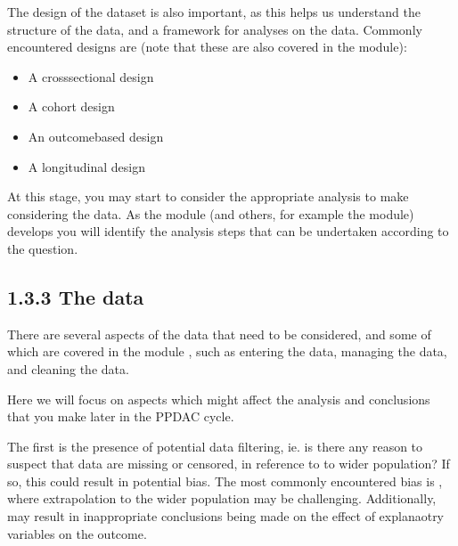 \documentclass[letterpaper,10pt,english]{jupyterBook}
\begin{document}
\sphinxAtStartPar
The design of the dataset is also important, as this helps us understand the structure of the data, and a framework for analyses on the data. Commonly encountered designs are (note that these are also covered in the  module):
\begin{itemize}
\item {} 
\sphinxAtStartPar
A cross\sphinxhyphen{}sectional design

\item {} 
\sphinxAtStartPar
A cohort design

\item {} 
\sphinxAtStartPar
An outcome\sphinxhyphen{}based design

\item {} 
\sphinxAtStartPar
A longitudinal design

\end{itemize}

\sphinxAtStartPar
At this stage, you may start to consider the appropriate analysis to make considering the data. As the module (and others, for example the  module) develops you will identify the analysis steps that can be undertaken according to the question.


\subsection{1.3.3 The data}
\label{\detokenize{01. Introduction:the-data}}
\sphinxAtStartPar
There are several aspects of the data that need to be considered, and some of which are covered in the module , such as entering the data, managing the data, and cleaning the data.

\sphinxAtStartPar
Here we will focus on aspects which might affect the analysis and conclusions that you make later in the PPDAC cycle.

\sphinxAtStartPar
The first is the presence of potential data filtering, ie. is there any reason to suspect that data are missing or censored, in reference to to wider population? If so, this could result in potential bias. The most commonly encountered bias is , where extrapolation to the wider population may be challenging. Additionally,  may result in inappropriate conclusions being made on the effect of explanaotry variables on the outcome.
\end{document}
